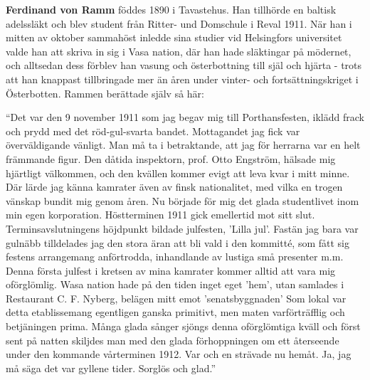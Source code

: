 
\begin{intersong}
\begin{footnotesize}

{\bf Ferdinand von Ramm} föddes 1890 i Tavastehus. Han tillhörde en baltisk 
adelssläkt och blev student från Ritter- und Domschule i Reval 1911.
När han i mitten av oktober sammahöst inledde sina studier vid 
Helsingfors universitet valde han att skriva in sig i Vasa nation, 
där han hade släktingar på mödernet, och alltsedan dess förblev han 
vasung och österbottning till själ och hjärta - trots att han knappast 
tillbringade mer än åren under vinter- och fortsättningskriget i 
Österbotten. Rammen berättade själv så här:

\vspace{3mm}
``Det var den 9 november 1911 som jag begav mig till
Porthansfesten, iklädd frack och prydd med det röd-gul-svarta
bandet. Mottagandet jag fick var överväldigande vänligt. Man
må ta i betraktande, att jag för herrarna var en helt främmande
figur. Den dåtida inspektorn, prof. Otto Engström, hälsade mig
hjärtligt välkommen, och den kvällen kommer evigt att leva kvar
i mitt minne. Där lärde jag känna kamrater även av finsk
nationalitet, med vilka en trogen vänskap bundit mig genom åren.
Nu började för mig det glada studentlivet inom min egen
korporation. Höstterminen 1911 gick emellertid mot sitt slut.
Terminsavslutningens höjdpunkt bildade julfesten, 'Lilla jul'.
Fastän jag bara var gulnäbb tilldelades jag den stora äran att bli
vald i den kommitté, som fått sig festens arrangemang
anförtrodda, inhandlande av lustiga små presenter m.m. Denna
första julfest i kretsen av mina kamrater kommer alltid att vara
mig oförglömlig. Wasa nation hade på den tiden inget eget 'hem',
utan samlades i Restaurant C. F. Nyberg, belägen mitt emot
'senatsbyggnaden' Som lokal var detta etablissemang egentligen
ganska primitivt, men maten varförträfflig och betjäningen prima.
Många glada sånger sjöngs denna oförglömtiga kväll och först
sent på natten skiljdes man med den glada förhoppningen om
ett återseende under den kommande vårterminen 1912. Var
och en strävade nu hemåt. Ja, jag må säga det var gyllene
tider. Sorglös och glad.''


\end{footnotesize}
\end{intersong}
